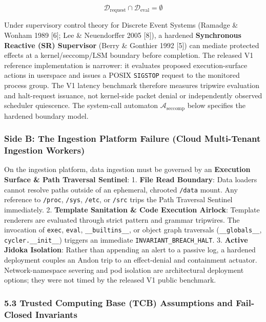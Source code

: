 \documentclass[
  10pt,letterpaper]{article}
\begin{document}
\[\mathcal{D}_{\text{request}} \cap \mathcal{D}_{\text{eval}} = \emptyset\]

Under supervisory control theory for Discrete Event Systems (Ramadge \&
Wonham 1989 {[}6{]}; Lee \& Neuendorffer 2005 {[}8{]}), a hardened
\textbf{Synchronous Reactive (SR) Supervisor} (Berry \& Gonthier 1992
{[}5{]}) can mediate protected effects at a kernel/seccomp/LSM boundary
before completion. The released V1 reference implementation is narrower:
it evaluates proposed execution-surface actions in userspace and issues a
POSIX \texttt{SIGSTOP} request to the monitored process group. The V1
latency benchmark therefore measures tripwire evaluation and halt-request
issuance, not kernel-side packet denial or independently observed scheduler
quiescence. The system-call automaton \(\mathcal{A}_{\text{seccomp}}\)
below specifies the hardened boundary model.

\subsubsection{Side B: The Ingestion Platform Failure (Cloud
Multi-Tenant Ingestion
Workers)}\label{side-b-the-ingestion-platform-failure-cloud-multi-tenant-ingestion-workers}

On the ingestion platform, data ingestion must be governed by an
\textbf{Execution Surface \& Path Traversal Sentinel}: 1. \textbf{File
Read Boundary}: Data loaders cannot resolve paths outside of an
ephemeral, chrooted \texttt{/data} mount. Any reference to
\texttt{/proc}, \texttt{/sys}, \texttt{/etc}, or \texttt{/src} trips the
Path Traversal Sentinel immediately. 2. \textbf{Template Sanitation \&
Code Execution Airlock}: Template renderers are evaluated through strict
pattern and grammar tripwires. The invocation of \texttt{exec},
\texttt{eval}, \texttt{\_\_builtins\_\_}, or object graph traversals
(\texttt{\_\_globals\_\_}, \texttt{cycler.\_\_init\_\_}) triggers an
immediate \texttt{INVARIANT\_BREACH\_HALT}. 3. \textbf{Active Jidoka
Isolation}: Rather than appending an alert to a passive log, a hardened
deployment couples an Andon trip to an effect-denial and containment
actuator. Network-namespace severing and pod isolation are architectural
deployment options; they were not timed by the released V1 public benchmark.

\subsubsection{5.3 Trusted Computing Base (TCB) Assumptions and
Fail-Closed
Invariants}\label{trusted-computing-base-tcb-assumptions-and-fail-closed-invariants}
\end{document}
